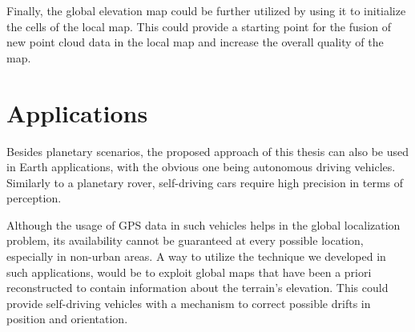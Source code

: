 Finally, the global elevation map could be further utilized by using it
to initialize the cells of the local map.
This could provide a starting point for the fusion of new point cloud
data in the local map and increase the overall quality of the map.

\section{Applications}

Besides planetary scenarios, the proposed approach of this thesis
can also be used in Earth applications, with the obvious one being
autonomous driving vehicles.
Similarly to a planetary rover, self-driving cars require high
precision in terms of perception.

Although the usage of GPS data in such vehicles helps in the global
localization problem, its availability cannot be guaranteed at every
possible location, especially in non-urban areas.
A way to utilize the technique we developed in such applications,
would be to exploit global maps that have been a priori reconstructed
to contain information about the terrain's elevation.
This could provide self-driving vehicles with a mechanism to correct
possible drifts in position and orientation.

